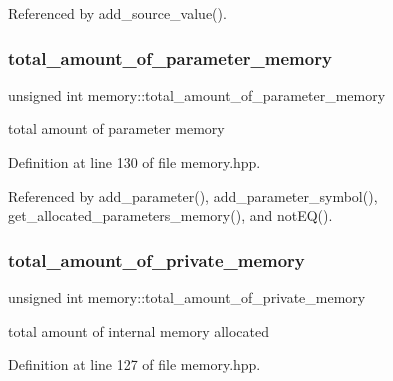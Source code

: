 Referenced by add\+\_\+source\+\_\+value().

\mbox{\label{classmemory_a7622b3919a88ad790782facf9d490f95}} 
\subsubsection{\texorpdfstring{total\+\_\+amount\+\_\+of\+\_\+parameter\+\_\+memory}{total\_amount\_of\_parameter\_memory}}
{\footnotesize\ttfamily unsigned int memory\+::total\+\_\+amount\+\_\+of\+\_\+parameter\+\_\+memory\hspace{0.3cm}{\ttfamily [private]}}



total amount of parameter memory 



Definition at line 130 of file memory.\+hpp.



Referenced by add\+\_\+parameter(), add\+\_\+parameter\+\_\+symbol(), get\+\_\+allocated\+\_\+parameters\+\_\+memory(), and not\+E\+Q().

\mbox{\label{classmemory_a3103b469a197d1ec13ece20de36c994d}} 
\subsubsection{\texorpdfstring{total\+\_\+amount\+\_\+of\+\_\+private\+\_\+memory}{total\_amount\_of\_private\_memory}}
{\footnotesize\ttfamily unsigned int memory\+::total\+\_\+amount\+\_\+of\+\_\+private\+\_\+memory\hspace{0.3cm}{\ttfamily [private]}}



total amount of internal memory allocated 



Definition at line 127 of file memory.\+hpp.



